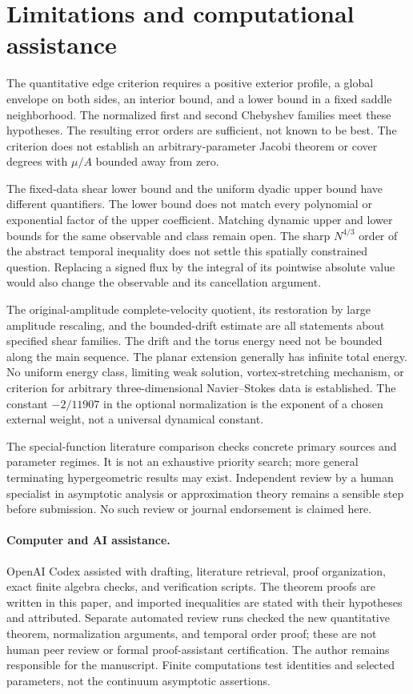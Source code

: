 \section{Limitations and computational assistance}\label{sec:discussion}

The quantitative edge criterion requires a positive exterior profile,
a global envelope on both sides, an interior bound, and a lower bound
in a fixed saddle neighborhood. The normalized first and second
Chebyshev families meet these hypotheses. The resulting error orders
are sufficient, not known to be best. The criterion does not establish
an arbitrary-parameter Jacobi theorem or cover degrees with
$\mu/A$ bounded away from zero.

The fixed-data shear lower bound and the uniform dyadic upper bound
have different quantifiers. The lower bound does not match every
polynomial or exponential factor of the upper coefficient. Matching
dynamic upper and lower bounds for the same observable and class
remain open. The sharp $N^{4/3}$ order of the abstract temporal
inequality does not settle this spatially constrained question.
Replacing a signed flux by the integral of its pointwise absolute
value would also change the observable and its cancellation argument.

The original-amplitude complete-velocity quotient, its restoration by
large amplitude rescaling, and the bounded-drift estimate are all
statements about specified shear families. The drift and the torus
energy need not be bounded along the main sequence. The planar
extension generally has infinite total energy. No uniform energy
class, limiting weak solution, vortex-stretching mechanism, or criterion
for arbitrary three-dimensional Navier--Stokes data is established.
The constant $-2/11907$ in the optional normalization is the exponent
of a chosen external weight, not a universal dynamical constant.

The special-function literature comparison checks concrete primary
sources and parameter regimes. It is not an exhaustive priority search;
more general terminating hypergeometric results may exist. Independent
review by a human specialist in asymptotic analysis or approximation
theory remains a sensible step before submission. No such review or
journal endorsement is claimed here.

\paragraph{Computer and AI assistance.}
OpenAI Codex assisted with drafting, literature retrieval, proof
organization, exact finite algebra checks, and verification scripts.
The theorem proofs are written in this paper, and imported inequalities
are stated with their hypotheses and attributed. Separate automated
review runs checked the new quantitative theorem, normalization
arguments, and temporal order proof; these are not human peer review
or formal proof-assistant certification. The author remains responsible
for the manuscript. Finite computations test identities and selected
parameters, not the continuum asymptotic assertions.

